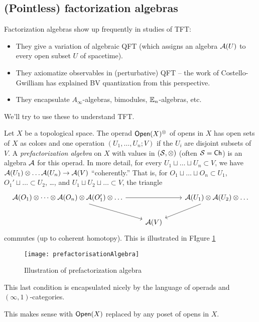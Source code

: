 \subsection{(Pointless) factorization algebras}

Factorization algebras show up frequently in studies of TFT:
\begin{itemize}
	\item They give a variation of algebraic QFT (which assigns an algebra $\mathcal{A}(U)$ to every open subset $U$ of spacetime).
	\item They axiomatize observables in (perturbative) QFT -- the work of Costello-Gwilliam has explained BV quantization from this perspective.
	\item They encapsulate $A_\infty$-algebras, bimodules, $\mathbb{E}_n$-algebras, etc.
\end{itemize}
We'll try to use these to understand TFT.

\begin{dfn}
	Let $X$ be a topological space.
	The operad $\mathsf{Open}(X)^{\otimes}$ of opens in $X$ has open sets of $X$ as colors and one operation $(U_1, \dots, U_n; V)$ if the $U_i$ are disjoint subsets of $V$.
	A \emph{prefactorization algebra} on $X$ with values in $(\mathcal{S}, \otimes)$ (often $\mathcal{S} = \mathsf{Ch}$) is an algebra $\mathcal{A}$ for this operad.
	In more detail, for every $U_1 \sqcup \dots \sqcup U_n \subset V$, we have $\mathcal{A}(U_1) \otimes \dots \mathcal{A}(U_n) \to \mathcal{A}(V)$ ``coherently.''
	That is, for $O_1 \sqcup \dots \sqcup O_n \subset U_1$, $O_1' \sqcup \dots \subset U_2$, \dots, and $U_1 \sqcup U_2 \sqcup \dots \subset V$, the triangle
	\[
		\begin{tikzcd}
			\Ac(O_1) \otimes \dots \otimes \Ac(O_n) \otimes \Ac(O_1') \otimes \dots \ar[rr] \ar[dr] & & \Ac(U_1) \otimes \Ac(U_2) \otimes \dots \ar[dl] \\
														& \Ac(V) &
		\end{tikzcd}
	\]
	commutes (up to coherent homotopy). This is illustrated in FIgure \ref{fig:prefactorisationAlgebra}
	\begin{figure}[h]
		\centering
		\texttt{[image: prefactorisationAlgebra]}
		\caption{Illustration of prefactorization algebra}
		\label{fig:prefactorisationAlgebra}
	\end{figure}
	This last condition is encapsulated nicely by the language of operads and $(\infty, 1)$-categories.
\end{dfn}

\begin{rmk}
	This makes sense with $\mathsf{Open}(X)$ replaced by any poset of opens in $X$.
\end{rmk}

